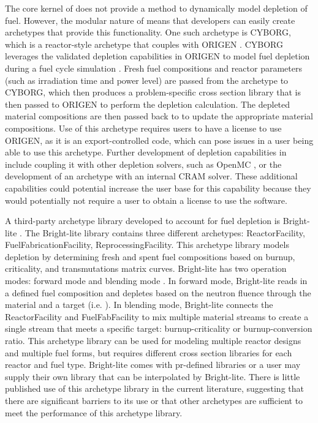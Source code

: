 The core kernel of \Cyclus does not provide a method to dynamically 
model depletion of fuel. However, the modular nature of \Cyclus means 
that developers can easily create archetypes that provide this 
functionality. One such archetype is \gls{CYBORG}, which is a 
reactor-style archetype that couples \Cyclus with ORIGEN 
\cite{skutnik_cyborg_2016}. \gls{CYBORG} leverages the validated 
depletion capabilities in ORIGEN to model fuel depletion during 
a fuel cycle simulation \cite{skutnik_cyborg_2016}. Fresh fuel  
compositions and reactor parameters (such as irradiation time and 
power level) are passed from the archetype to \gls{CYBORG}, which then 
produces a problem-specific cross section library that is then passed to 
ORIGEN to perform the depletion calculation. The depleted material 
compositions are then passed back to \Cyclus to update the 
appropriate material compositions. Use of this 
archetype requires users to have a license to use ORIGEN, as it 
is an export-controlled code, which can pose issues in a user being 
able to use this archetype. Further development of depletion 
capabilities in \Cyclus include coupling it with other 
depletion solvers, such as OpenMC \cite{romano_depletion_2021}, 
or the development of an archetype with an internal CRAM solver. 
These additional capabilities could potential increase the user base 
for this capability because they would potentially not require a user 
to obtain a license to use the software. 

A third-party archetype library developed to account for fuel depletion 
is Bright-lite \cite{schneider_integrated_2016}. The Bright-lite 
library contains three different archetypes: ReactorFacility, 
FuelFabricationFacility, ReprocessingFacility. This archetype library 
models depletion by determining fresh and spent fuel compositions
based on burnup, criticality, and transmutations matrix curves. 
Bright-lite has two operation modes: forward mode and blending 
mode \cite{schneider_integrated_2016}. In forward mode, Bright-lite 
reads in a defined fuel composition and depletes based on the neutron 
fluence through the material and a target (i.e. ). In 
blending mode, Bright-lite connects the ReactorFacility and 
FuelFabFacility to mix multiple material streams to create a single 
stream that meets a specific target: burnup-criticality or burnup-conversion
ratio. This archetype library can be used for modeling multiple reactor 
designs and multiple fuel forms, but requires different cross 
section libraries for each reactor and fuel type. Bright-lite comes 
with pr-defined libraries or a user may supply their own 
library that can be interpolated by Bright-lite. There is little 
published use of this archetype library in the current literature, 
suggesting that there are significant barriers to its use or that 
other archetypes are sufficient to meet the performance of this 
archetype library. 

